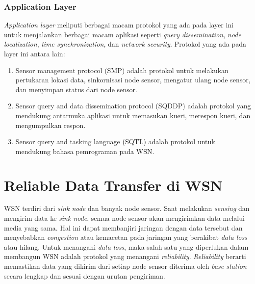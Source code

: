 \subsubsection{Application Layer}
\textit{Application layer} meliputi berbagai macam protokol yang ada pada layer ini untuk menjalankan berbagai macam aplikasi seperti \textit{query dissemination}, \textit{node localization}, \textit{time synchronization}, dan \textit{network security}. Protokol yang ada pada layer ini antara lain:
\begin{enumerate}
	\item Sensor management protocol (SMP) adalah protokol untuk melakukan pertukaran lokasi data, sinkornisasi node sensor, mengatur ulang node sensor, dan menyimpan status dari node sensor.
	\item Sensor query and data dissemination protocol (SQDDP) adalah protokol yang mendukung antarmuka aplikasi untuk memasukan kueri, merespon kueri, dan mengumpulkan respon.
	\item Sensor query and tasking language (SQTL) adalah protokol untuk mendukung bahasa pemrograman pada WSN.
\end{enumerate}

\section{Reliable Data Transfer di WSN \cite{reliable}}
WSN terdiri dari \textit{sink node} dan banyak node sensor. Saat melakukan \textit{sensing} dan mengirim data ke \textit{sink node}, semua node sensor akan mengirimkan data melalui media yang sama. Hal ini dapat membanjiri jaringan dengan data tersebut dan menyebabkan \textit{congestion} atau kemacetan pada jaringan yang berakibat \textit{data loss} atau hilang. Untuk menangani \textit{data loss}, maka salah satu yang diperlukan dalam membangun WSN adalah protokol yang menangani \textit{reliability}. \textit{Reliability} berarti memastikan data yang dikirim dari setiap node sensor diterima oleh \textit{base station} secara lengkap dan sesuai dengan urutan pengiriman.


